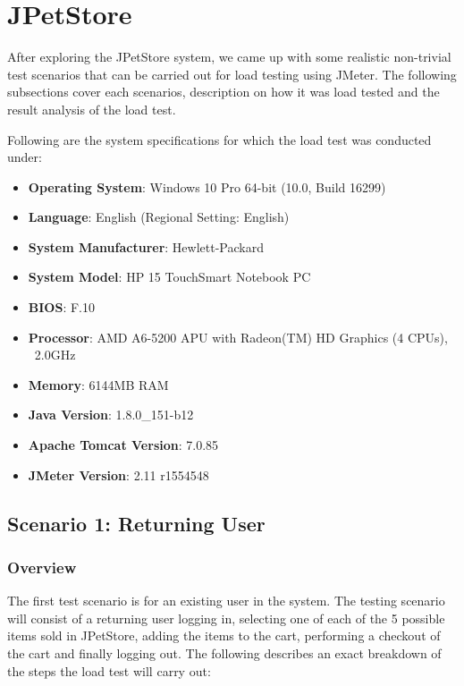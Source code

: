 \documentclass[fontsize=12pt,paper=letter,twoside]{scrartcl}
\begin{document}
\newpage
\section{JPetStore}

After exploring the JPetStore system, we came up with some realistic non-trivial test scenarios that can be carried out for load testing using JMeter. The following subsections cover each scenarios, description on how it was load tested and the result analysis of the load test.

\bigskip
\noindent Following are the system specifications for which the load test was conducted under:
\begin{itemize}
\item \textbf{Operating System}: Windows 10 Pro 64-bit (10.0, Build 16299)
\item \textbf{Language}: English (Regional Setting: English)
\item \textbf{System Manufacturer}: Hewlett-Packard
\item \textbf{System Model}: HP 15 TouchSmart Notebook PC
\item \textbf{BIOS}: F.10
\item \textbf{Processor}: AMD A6-5200 APU with Radeon(TM) HD Graphics (4 CPUs), ~2.0GHz
\item \textbf{Memory}: 6144MB RAM
\item \textbf{Java Version}: 1.8.0\_151-b12
\item \textbf{Apache Tomcat Version}: 7.0.85
\item \textbf{JMeter Version}: 2.11 r1554548
\end{itemize}

\newpage
\subsection{Scenario 1: Returning User}

\subsubsection{Overview}
The first test scenario is for an existing user in the system. The testing scenario will consist of a returning user logging in, selecting one of each of the 5 possible items sold in JPetStore, adding the items to the cart, performing a checkout of the cart and finally logging out. The following describes an exact breakdown of the steps the load test will carry out:
\end{document}
